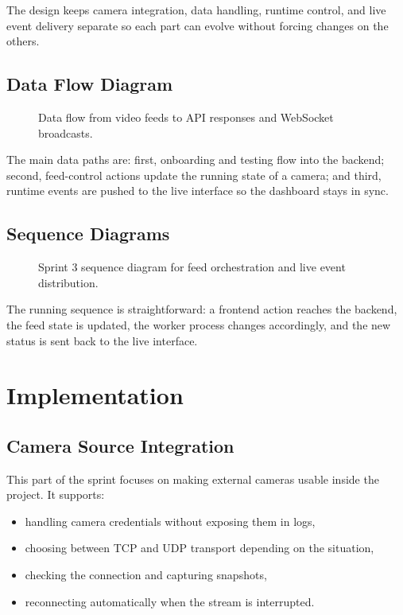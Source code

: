 The design keeps camera integration, data handling, runtime control, and live event delivery separate so each part can evolve without forcing changes on the others.

\subsection{Data Flow Diagram}
\begin{figure}[H]
    \centering
    \caption{Data flow from video feeds to API responses and WebSocket broadcasts.}
    \label{fig:sprint3_data_flow}
\end{figure}

The main data paths are: first, onboarding and testing flow into the backend; second, feed-control actions update the running state of a camera; and third, runtime events are pushed to the live interface so the dashboard stays in sync.

\subsection{Sequence Diagrams}
\begin{figure}[H]
    \centering
    \caption{Sprint 3 sequence diagram for feed orchestration and live event distribution.}
    \label{fig:sprint3_sequence}
\end{figure}

The running sequence is straightforward: a frontend action reaches the backend, the feed state is updated, the worker process changes accordingly, and the new status is sent back to the live interface.

\section{Implementation}
\subsection{Camera Source Integration}
This part of the sprint focuses on making external cameras usable inside the project. It supports:
\begin{itemize}
    \item handling camera credentials without exposing them in logs,
    \item choosing between TCP and UDP transport depending on the situation,
    \item checking the connection and capturing snapshots,
    \item reconnecting automatically when the stream is interrupted.
\end{itemize}

